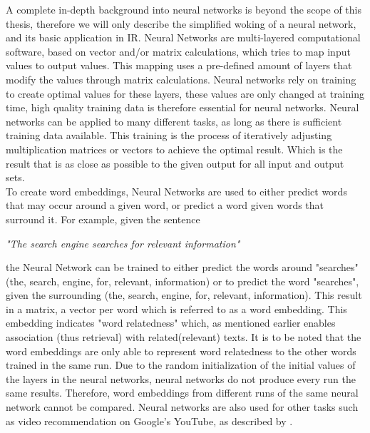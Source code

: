 \documentclass[../../Thesis.tex]{subfiles}
\begin{document}
A complete in-depth background into neural networks is beyond the scope of this thesis, therefore we will only describe the simplified woking of a neural network, and its basic application in IR.
Neural Networks are multi-layered computational software, based on vector and/or matrix calculations, which tries to map input values to output values. This mapping uses a pre-defined amount of layers that modify the values through matrix calculations. Neural networks rely on training to create optimal values for these layers, these values are only changed at training time, high quality training data is therefore essential for neural networks. Neural networks can be applied to many different tasks, as long as there is sufficient training data available. This training is the process of iteratively adjusting multiplication matrices or vectors to achieve the optimal result. Which is the result that is as close as possible to the given output for all input and output sets.\\To create word embeddings, Neural Networks are used to either predict words that may occur around a given word, or predict a word given words that surround it. For example, given the sentence\\
\begin{center}
\textit{"The search engine searches for relevant information"}
\end{center}
the Neural Network can be trained to either predict the words around "searches" (the, search, engine, for, relevant, information) or to predict the word "searches", given the surrounding (the, search, engine, for, relevant, information). This result in a matrix, a vector per word which is referred to as a word embedding. This embedding indicates "word relatedness" which, as mentioned earlier enables association (thus retrieval) with related(relevant) texts. It is to be noted that the word embeddings are only able to represent word relatedness to the other words trained in the same run. Due to the random initialization of the initial values of the layers in the neural networks, neural networks do not produce every run the same results. Therefore, word embeddings from different runs of the same neural network cannot be compared. Neural networks are also used for other tasks such as video recommendation on Google's YouTube, as described by \citet{covington2016deep}.
\end{document}
